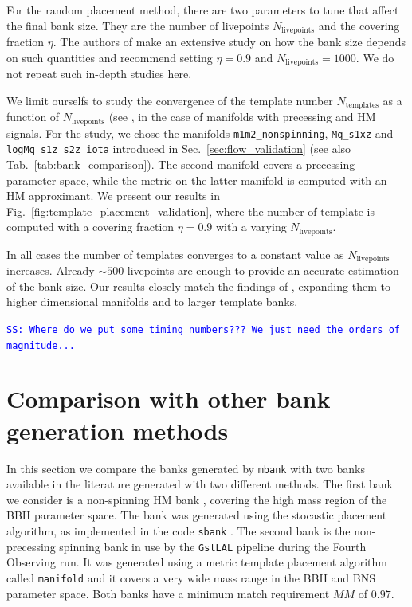 \documentclass[twocolumn,showpacs,preprintnumbers,nofootinbib,prd,
superscriptaddress,10pt]{revtex4-2}
\newcommand{\stefano}[1]{{\textcolor{blue}{\texttt{SS: #1}} }}
\begin{document}
For the random placement method, there are two parameters to tune that affect the final bank size. They are the number of livepoints $N_\text{livepoints}$ and the covering fraction $\eta$.
The authors of \cite{Coogan:2022qxs} make an extensive study on how the bank size depends on such quantities and recommend setting $\eta = 0.9$ and $N_\text{livepoints} = 1000$. We do not repeat such in-depth studies here.

We limit ourselfs to study the convergence of the template number $N_\text{templates}$ as a function of $N_\text{livepoints}$ (see \cite[Fig.~4 (right)]{Coogan:2022qxs}, in the case of manifolds with precessing and HM signals.
For the study, we chose the manifolds \texttt{m1m2\_nonspinning}, \texttt{Mq\_s1xz} and \texttt{logMq\_s1z\_s2z\_iota} introduced in Sec.~\ref{sec:flow_validation} (see also Tab.~\ref{tab:bank_comparison}). The second manifold covers a precessing parameter space, while the metric on the latter manifold is computed with an HM approximant.
We present our results in Fig.~\ref{fig:template_placement_validation}, where the number of template is computed with a covering fraction $\eta = 0.9$ with a varying $N_\text{livepoints}$.

In all cases the number of templates converges to a constant value as $N_\text{livepoints}$ increases. Already $\sim 500$ livepoints are enough to provide an accurate estimation of the bank size.
Our results closely match the findings of \cite{Coogan:2022qxs}, expanding them to higher dimensional manifolds and to larger template banks.

\stefano{Where do we put some timing numbers??? We just need the orders of magnitude...}

\section{Comparison with other bank generation methods} \label{sec:other_methods}

In this section we compare the banks generated by \texttt{mbank} with two banks available in the literature generated with two different methods.
The first bank we consider is a non-spinning HM bank \cite{Harry:2017weg}, covering the high mass region of the BBH parameter space. The bank was generated using the stocastic placement algorithm, as implemented in the code \texttt{sbank} \cite{Ajith:2012mn}.
The second bank is the non-precessing spinning bank \cite{Sakon:2022ibh} in use by the \texttt{GstLAL} pipeline \cite{PhysRevD.95.042001, gstlal_paper2} during the Fourth Observing run. It was generated using a metric template placement algorithm called \texttt{manifold} \cite{Hanna:2022zpk} and it covers a very wide mass range in the BBH and BNS parameter space.
Both banks have a minimum match requirement $MM$ of $0.97$.
\end{document}
